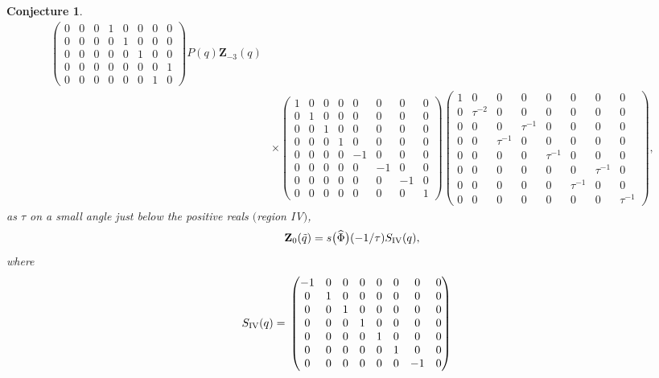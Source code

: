 \documentclass[pdftex]{sigma}
\numberwithin{equation}{section}
\newtheorem{Conjecture}[Theorem]{Conjecture}
\def\tq{\tilde{q}}
\def\Phih{\widehat{\Phi}}
\def\tq{\tilde{q}}
\begin{document}
\begin{Conjecture}
\begin{align*}
\begin{pmatrix}
 0 & 0 & 0 & 1 & 0 & 0 & 0 & 0\\
 0 & 0 & 0 & 0 & 1 & 0 & 0 & 0\\
 0 & 0 & 0 & 0 & 0 & 1 & 0 & 0\\
 0 & 0 & 0 & 0 & 0 & 0 & 0 & 1\\
 0 & 0 & 0 & 0 & 0 & 0 & 1 & 0
\end{pmatrix}P(q)\mathbf{Z}_{-3}(q)\\
&\times
\begin{pmatrix}
 1 & 0 & 0 & 0 & 0 & 0 & 0 & 0\\
 0 & 1 & 0 & 0 & 0 & 0 & 0 & 0\\
 0 & 0 & 1 & 0 & 0 & 0 & 0 & 0\\
 0 & 0 & 0 & 1 & 0 & 0 & 0 & 0\\
 0 & 0 & 0 & 0 & -1 & 0 & 0 & 0\\
 0 & 0 & 0 & 0 & 0 & -1 & 0 & 0\\
 0 & 0 & 0 & 0 & 0 & 0 & -1 & 0\\
 0 & 0 & 0 & 0 & 0 & 0 & 0 & 1
\end{pmatrix}
\begin{pmatrix}
 1 & 0 & 0 & 0 & 0 & 0 & 0 & 0\\
 0 & \tau^{-2} & 0 & 0 & 0 & 0 & 0 & 0\\
 0 & 0 & 0 & \tau^{-1} & 0 & 0 & 0 & 0\\
 0 & 0 & \tau^{-1} & 0 & 0 & 0 & 0 & 0\\
 0 & 0 & 0 & 0 & \tau^{-1} & 0 & 0 & 0\\
 0 & 0 & 0 & 0 & 0 & 0 & \tau^{-1} & 0\\
 0 & 0 & 0 & 0 & 0 & \tau^{-1} & 0 & 0\\
 0 & 0 & 0 & 0 & 0 & 0 & 0 & \tau^{-1}
\end{pmatrix},
\end{align*}
as $\tau$ on a small angle just below the positive reals $($region {\rm IV}$)$,
\[
\mathbf{Z}_{0}(\tq) =s\bigl(\Phih\bigr)(-1/\tau)S_{\rm IV}(q),
\]
where
\begin{align*}
S_{\rm IV}(q) ={}&\begin{pmatrix}
 -1 & 0 & 0 & 0 & 0 & 0 & 0 & 0\\
 0 & 1 & 0 & 0 & 0 & 0 & 0 & 0\\
 0 & 0 & 1 & 0 & 0 & 0 & 0 & 0\\
 0 & 0 & 0 & 1 & 0 & 0 & 0 & 0\\
 0 & 0 & 0 & 0 & 1 & 0 & 0 & 0\\
 0 & 0 & 0 & 0 & 0 & 1 & 0 & 0\\
 0 & 0 & 0 & 0 & 0 & 0 & -1 & 0\\

\end{pmatrix}
\end{align*}
\end{Conjecture}
\end{document}

